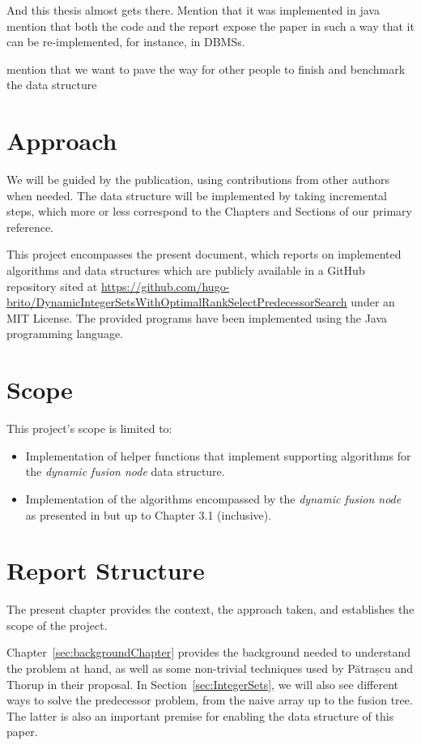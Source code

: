 And this thesis almost gets there.
Mention that it was implemented in java
mention that both the code and the report expose the paper in such a way that it can be re-implemented, for instance, in DBMSs.

mention that we want to pave the way for other people to finish and benchmark the data structure

\section{Approach} %

We will be guided by the \cite{patrascu2014dynamic} publication, using contributions from other authors when needed. The data structure will be implemented by taking incremental steps, which more or less correspond to the Chapters and Sections of our primary reference.

This project encompasses the present document, which reports on implemented algorithms and data structures which are publicly available in a GitHub repository sited at \url{https://github.com/hugo-brito/DynamicIntegerSetsWithOptimalRankSelectPredecessorSearch} under an MIT License.
The provided programs have been implemented using the Java programming language.

\section{Scope} \label{sec:scope}

This project's scope is limited to:
\begin{itemize}
    \item
    Implementation of helper functions that implement supporting algorithms for the \textit{dynamic fusion node} data structure.
    
    \item
    Implementation of the algorithms encompassed by the \textit{dynamic fusion node} as presented in \cite{patrascu2014dynamic} but up to Chapter 3.1 (inclusive).
\end{itemize}

\section{Report Structure}

The present chapter provides the context, the approach taken, and establishes the scope of the project.

Chapter~\ref{sec:backgroundChapter} provides the background needed to understand the problem at hand, as well as some non-trivial techniques used by Pătrașcu and Thorup in their proposal.
In Section~\ref{sec:IntegerSets}, we will also see different ways to solve the predecessor problem, from the naive array up to the fusion tree. The latter is also an important premise for enabling the data structure of this paper.

